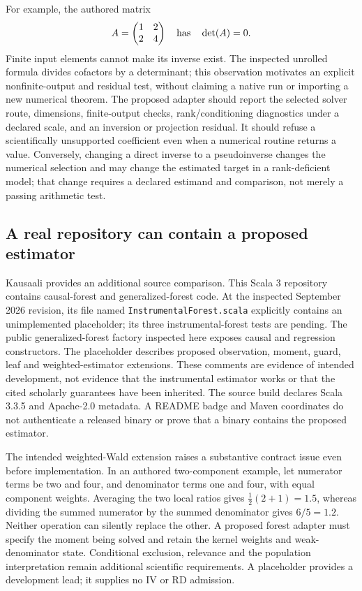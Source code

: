For example, the authored matrix
\[
 A=\begin{pmatrix}1&2\\2&4\end{pmatrix}
 \quad\hbox{has}\quad \det(A)=0.
\]
Finite input elements cannot make its inverse exist. The inspected unrolled formula divides cofactors by a determinant; this observation motivates an explicit nonfinite-output and residual test, without claiming a native run or importing a new numerical theorem. The proposed adapter should report the selected solver route, dimensions, finite-output checks, rank/conditioning diagnostics under a declared scale, and an inversion or projection residual. It should refuse a scientifically unsupported coefficient even when a numerical routine returns a value. Conversely, changing a direct inverse to a pseudoinverse changes the numerical selection and may change the estimated target in a rank-deficient model; that change requires a declared estimand and comparison, not merely a passing arithmetic test.~\citep{exec25_javaiv_ejml,exec25_javaiv_choice}

\subsection{A real repository can contain a proposed estimator}

Kausaali provides an additional source comparison. This Scala 3 repository contains causal-forest and generalized-forest code. At the inspected September 2026 revision, its file named \texttt{InstrumentalForest.scala} explicitly contains an unimplemented placeholder; its three instrumental-forest tests are pending. The public generalized-forest factory inspected here exposes causal and regression constructors. The placeholder describes proposed observation, moment, guard, leaf and weighted-estimator extensions. These comments are evidence of intended development, not evidence that the instrumental estimator works or that the cited scholarly guarantees have been inherited. The source build declares Scala 3.3.5 and Apache-2.0 metadata. A README badge and Maven coordinates do not authenticate a released binary or prove that a binary contains the proposed estimator.~\citep{exec25_javaiv_kausaali}

The intended weighted-Wald extension raises a substantive contract issue even before implementation. In an authored two-component example, let numerator terms be two and four, and denominator terms one and four, with equal component weights. Averaging the two local ratios gives $\tfrac12(2+1)=1.5$, whereas dividing the summed numerator by the summed denominator gives $6/5=1.2$. Neither operation can silently replace the other. A proposed forest adapter must specify the moment being solved and retain the kernel weights and weak-denominator state. Conditional exclusion, relevance and the population interpretation remain additional scientific requirements. A placeholder provides a development lead; it supplies no IV or RD admission.~\citep{exec25_javaiv_kausaali,exec25_javaiv_choice}

